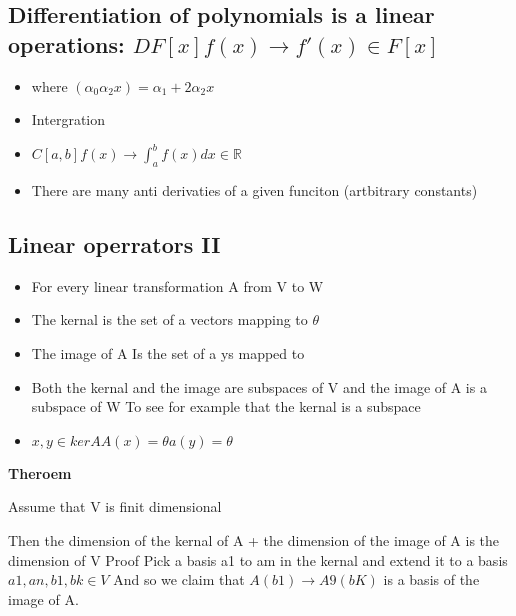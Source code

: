 \documentclass[twocolumn]{article}
\providecommand{\tightlist}{%
  \setlength{\itemsep}{0pt}\setlength{\parskip}{0pt}}
\begin{document}
\hypertarget{differentiation-of-polynomials-is-a-linear-operations-d-fx-fx-to-fx-in-fx}{%
\subsection{\texorpdfstring{Differentiation of polynomials is a linear
operations:
\(D F[x] f(x) \to f'(x) \in F[x]\)}{Differentiation of polynomials is a linear operations: D F{[}x{]} f(x) \textbackslash{}to f'(x) \textbackslash{}in F{[}x{]}}}\label{differentiation-of-polynomials-is-a-linear-operations-d-fx-fx-to-fx-in-fx}}

\begin{itemize}
\tightlist
\item
  where \((\alpha_0 \alpha_2x ) = \alpha_1 + 2 \alpha_2 x\)
\item
  Intergration
\item
  \(C[a,b] f(x) \to \int_a^b f(x)dx \in \mathbb{R}\)
\item
  There are many anti derivaties of a given funciton (artbitrary
  constants)
\end{itemize}

\hypertarget{linear-operrators-ii}{%
\subsection{Linear operrators II}\label{linear-operrators-ii}}

\begin{itemize}
\item
  For every linear transformation A from V to W
\item
  The kernal is the set of a vectors mapping to \(\theta\)
\item
  The image of A Is the set of a ys mapped to
\item
  Both the kernal and the image are subspaces of V and the image of A is
  a subspace of W To see for example that the kernal is a subspace
\item
  \(x,y \in ker A A(x) = \theta a(y) = \theta\)
\end{itemize}

\textbf{Theroem}

Assume that V is finit dimensional

Then the dimension of the kernal of A + the dimension of the image of A
is the dimension of V Proof Pick a basis a1 to am in the kernal and
extend it to a basis \(a1 , an, b1, bk \in V\) And so we claim that
\(A (b1) \to A9(bK)\) is a basis of the image of A.
\end{document}
